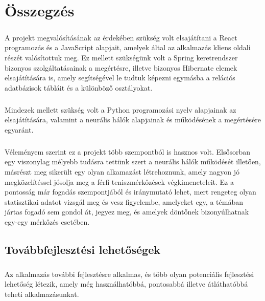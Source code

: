 \chapter{Összegzés}\label{ch:MAT}
\paragraph{}
A projekt megvalósításának az érdekében szükség volt elsajátítani a React programozás és a JavaScript alapjait, amelyek által az alkalmazás kliens oldali részét valósítottuk meg. Ez mellett szükségünk volt a Spring keretrendszer bizonyos szolgáltatásainak a megértésre, illetve bizonyos Hibernate elemek elsajátítására is, amely segítségével le tudtuk képezni egymásba a relációs adatbázisok tábláit és a különböző osztályokat. 

\paragraph{}
Mindezek mellett szükség volt a Python programozási nyelv alapjainak az elsajátítására, valamint a neurális hálók alapjainak és működésének a megértésére egyaránt.

\paragraph{}
Véleményem szerint ez a projekt több szempontból is hasznos volt. Elsősorban egy viszonylag mélyebb tudásra tettünk szert a neurális hálók működését illetően, másrészt meg sikerült egy olyan alkamazást létrehoznunk, amely nagyon jó megközelítéssel jósolja meg a férfi teniszmérkőzések végkimeneteleit. Ez a pontosság már fogadás szempontjából és iránymutató lehet, mert rengeteg olyan statisztikai adatot vizsgál meg és vesz figyelembe, amelyeket egy,  a témában jártas fogadó sem gondol át, jegyez meg, és amelyek döntőnek bizonyúlhatnak egy-egy mérkőzés esetében.
\section{Továbbfejlesztési lehetőségek}\label{sec:MAT:bev}
\paragraph{}
Az alkalmazás további fejlesztésre alkalmas, és több olyan potenciális fejlesztési lehetőség létezik, amely még használhatóbbá, pontosabbá illetve átláthatóbbá teheti alkalmazásunkat.

